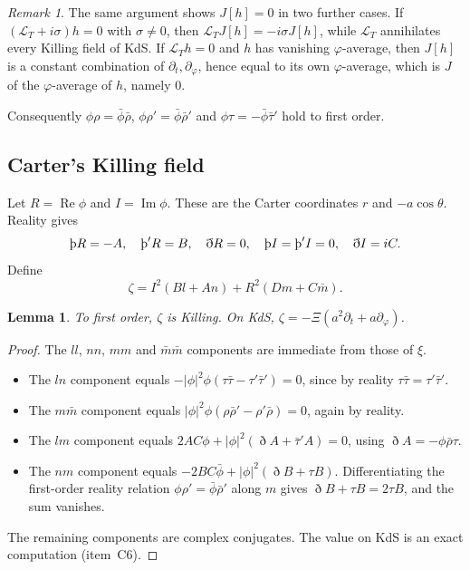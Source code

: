 \documentclass[11pt]{amsart}
\newtheorem{lemma}[theorem]{Lemma}
\theoremstyle{definition}
\theoremstyle{remark}
\newtheorem{remark}[theorem]{Remark}
\numberwithin{equation}{section}
\newcommand{\Th}{\text{\th}}
\newcommand{\cL}{\mathcal{L}}
\renewcommand{\Im}{\operatorname{Im}}
\renewcommand{\Re}{\operatorname{Re}}
\begin{document}
\begin{remark}\label{rem:Jvanish}
The same argument shows $J[h]=0$ in two further cases. If $(\cL_T+i\sigma)h=0$ with $\sigma\ne0$, then
$\cL_TJ[h]=-i\sigma J[h]$, while $\cL_T$ annihilates every Killing field of KdS. If $\cL_Th=0$ and $h$ has vanishing
$\varphi$-average, then $J[h]$ is a constant combination of $\partial_t,\partial_\varphi$, hence equal to its own
$\varphi$-average, which is $J$ of the $\varphi$-average of $h$, namely $0$.
\end{remark}

Consequently $\phi\rho=\bar\phi\bar\rho$, $\phi\rho'=\bar\phi\bar\rho'$ and $\phi\tau=-\bar\phi\bar\tau'$ hold to
first order.

\subsection{Carter's Killing field}
Let $R=\Re\phi$ and $I=\Im\phi$. These are the Carter coordinates $r$ and $-a\cos\theta$. Reality gives
\[
\Th R=-A,\quad \Th'R=B,\quad \eth R=0,\quad \Th I=\Th'I=0,\quad \eth I=iC.
\]
Define
\[
\zeta=I^2(Bl+An)+R^2(Dm+C\bar m).
\]

\begin{lemma}\label{lem:zeta}
To first order, $\zeta$ is Killing. On KdS, $\zeta=-\Xi(a^2\partial_t+a\partial_\varphi)$.
\end{lemma}
\begin{proof}
The $ll$, $nn$, $mm$ and $\bar m\bar m$ components are immediate from those of $\xi$.
\begin{itemize}
\item The $ln$ component equals $-|\phi|^2\phi(\tau\bar\tau-\tau'\bar\tau')=0$, since by reality
$\tau\bar\tau=\tau'\bar\tau'$.
\item The $m\bar m$ component equals $|\phi|^2\phi(\rho\bar\rho'-\rho'\bar\rho)=0$, again by reality.
\item The $lm$ component equals $2AC\phi+|\phi|^2(\eth A+\bar\tau'A)=0$, using $\eth A=-\phi\bar\rho\tau$.
\item The $nm$ component equals $-2BC\bar\phi+|\phi|^2(\eth B+\tau B)$. Differentiating the first-order reality
relation $\phi\rho'=\bar\phi\bar\rho'$ along $m$ gives $\eth B+\tau B=2\tau B$, and the sum vanishes.
\end{itemize}
The remaining components are complex conjugates. The value on KdS is an exact computation (item~C6).
\end{proof}
\end{document}
